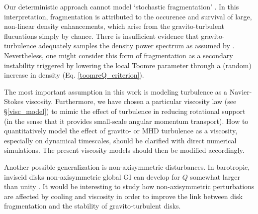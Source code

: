 
Our deterministic approach cannot model `stochastic fragmentation'
\citep{paardekooper12,hopkins13}. In this interpretation,  
fragmentation is attributed to the occurence and survival 
of large, non-linear density enhancements, which arise from the
gravito-turbulent flucuations simply by chance. %
There is insufficient evidence that gravito-turbulence adequately samples
the density power spectrum as assumed by \cite{hopkins13}.
Nevertheless, one might consider this form of fragmentation as a secondary instability
triggered by lowering the local 
Toomre parameter through a (random) increase in density 
(Eq. \ref{toomreQ_criterion}).


The most important assumption in this work is modeling turbulence as a  
Navier-Stokes viscosity. Furthermore, we have chosen a particular  
viscosity law (see \S\ref{visc_model}) to mimic the effect of 
turbulence in reducing rotational support (in the sense that it
provides small-scale angular momentum transport). 
How to quantitatively model the effect of gravito- or MHD turbulence  
as a viscosity, especially on dynamical timescales, should be 
clarified with direct numerical simulations. The present viscosity
models should then be modified accordingly. 

Another possible generalization is non-axisymmetric
disturbances. In barotropic, inviscid disks  
non-axisymmetric global GI can develop for $Q$ somewhat larger than unity
\citep{papaloizou89,adams89,papaloizou91,laughlin97}. It would be interesting to study
how non-axisymmetric perturbations are affected by cooling and
viscosity in order to improve %
the link between disk fragmentation and the
stability of gravito-turbulent disks.   



